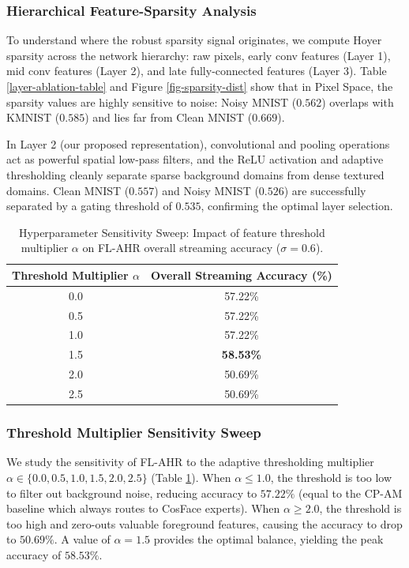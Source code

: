 \documentclass{article}
\theoremstyle{plain}
\theoremstyle{definition}
\theoremstyle{remark}
\begin{document}
\subsubsection{Hierarchical Feature-Sparsity Analysis}
To understand where the robust sparsity signal originates, we compute Hoyer sparsity across the network hierarchy: raw pixels, early conv features (Layer 1), mid conv features (Layer 2), and late fully-connected features (Layer 3). Table \ref{layer-ablation-table} and Figure \ref{fig-sparsity-dist} show that in Pixel Space, the sparsity values are highly sensitive to noise: Noisy MNIST ($0.562$) overlaps with KMNIST ($0.585$) and lies far from Clean MNIST ($0.669$). 

In Layer 2 (our proposed representation), convolutional and pooling operations act as powerful spatial low-pass filters, and the ReLU activation and adaptive thresholding cleanly separate sparse background domains from dense textured domains. Clean MNIST ($0.557$) and Noisy MNIST ($0.526$) are successfully separated by a gating threshold of $0.535$, confirming the optimal layer selection.

\begin{table}[h]
\caption{Hyperparameter Sensitivity Sweep: Impact of feature threshold multiplier $\alpha$ on FL-AHR overall streaming accuracy ($\sigma=0.6$).}
\label{threshold-sensitivity-table}
\vskip 0.1in
\begin{center}
\setlength{\tabcolsep}{3pt}
\begin{scriptsize}
\begin{tabular}{cc}
\toprule
\textbf{Threshold Multiplier $\alpha$} & \textbf{Overall Streaming Accuracy (\%)} \\
\midrule
0.0 & 57.22\% \\
0.5 & 57.22\% \\
1.0 & 57.22\% \\
1.5 & \textbf{58.53\%} \\
2.0 & 50.69\% \\
2.5 & 50.69\% \\
\bottomrule
\end{tabular}
\end{scriptsize}
\end{center}
\vspace*{-8pt}
\end{table}

\subsubsection{Threshold Multiplier Sensitivity Sweep}
We study the sensitivity of FL-AHR to the adaptive thresholding multiplier $\alpha \in \{0.0, 0.5, 1.0, 1.5, 2.0, 2.5\}$ (Table \ref{threshold-sensitivity-table}). When $\alpha \le 1.0$, the threshold is too low to filter out background noise, reducing accuracy to $57.22\%$ (equal to the CP-AM baseline which always routes to CosFace experts). When $\alpha \ge 2.0$, the threshold is too high and zero-outs valuable foreground features, causing the accuracy to drop to $50.69\%$. A value of $\alpha=1.5$ provides the optimal balance, yielding the peak accuracy of $58.53\%$.
\end{document}
